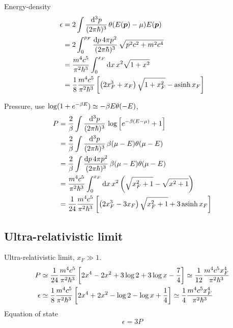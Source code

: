 Energy-density
\begin{equation}
\begin{split}
	\epsilon &=  2 \int \frac{\mathop{}\!\mathrm{d}^3 p}{(2 \pi \hbar)^3} \, \theta(E({\bm{p}})-\mu) E({\bm{p}}) \\
	         &=  2 \int_0^{p_F} \frac{\mathop{}\!\mathrm{d} p \, 4 \pi p^2}{(2 \pi \hbar)^3} \, \sqrt{p^2 c^2 + m^2 c^4} \\
	         &= \frac{m^4 c^5}{\pi^2 \hbar^3} \int_0^{x_F} \mathop{}\!\mathrm{d} x \, x^2 \sqrt{1 + x^2} \\
	         &= \frac{1}{8} \frac{m^4 c^5}{\pi^2 \hbar^3} \left[ \left( 2 x_F^3 + x_F \right) \sqrt{1 + x_F^2} - \operatorname{asinh} x_F \right] \\
\end{split}
\end{equation}

Pressure, use $\log (1 + e^{-\beta E}) \simeq -\beta E \theta(-E)$,
\begin{equation}
\begin{split}
	P &= \frac{2}{\beta} \int \frac{\mathop{}\!\mathrm{d}^3 p}{(2 \pi \hbar)^3} \, \log \left[ e^{-\beta (E - \mu)} + 1 \right] \\
	  &= \frac{2}{\beta} \int \frac{\mathop{}\!\mathrm{d}^3 p}{(2 \pi \hbar)^3} \, \beta (\mu - E) \theta(\mu - E) \\
	  &= \frac{2}{\beta} \int \frac{\mathop{}\!\mathrm{d} p \, 4 \pi p^2}{(2 \pi \hbar)^3} \, \beta (\mu - E) \theta(\mu - E) \\
	  &= \frac{m^4 c^5}{\pi^2 \hbar^3} \int_0^{x_F} \mathop{}\!\mathrm{d} x \, x^2 \left( \sqrt{x_F^2+1} - \sqrt{x^2+1} \right) \\
	  &= \frac{1}{24} \frac{m^4 c^5}{\pi^2 \hbar^3} \left[ \left( 2 x_F^3 - 3 x_F \right) \sqrt{x_F^2 + 1} + 3 \operatorname{asinh} x_F \right] \\
\end{split}
\end{equation}

\subsection{Ultra-relativistic limit}

Ultra-relativistic limit, $x_F \gg 1$.
\begin{equation}
\begin{split}
	P        &\simeq \frac{1}{24} \frac{m^4 c^5}{\pi^2 \hbar^3} \left[ 2 x^{4} - 2 x^{2} + 3 \log 2 + 3 \log x - \frac{7}{4} \right] \simeq \frac{1}{12} \frac{m^4 c^5 x_F^4}{\pi^2 \hbar^3} \\
	\epsilon &\simeq \frac{1}{8}  \frac{m^4 c^5}{\pi^2 \hbar^3} \left[ 2 x^{4} + 2 x^{2} - \log 2 - \log x + \frac{1}{4} \right] \simeq \frac{1}{4} \frac{m^4 c^5 x_F^4}{\pi^2 \hbar^3} \\
\end{split}
\end{equation}
Equation of state
\begin{equation}
	\epsilon = 3 P
\end{equation}

